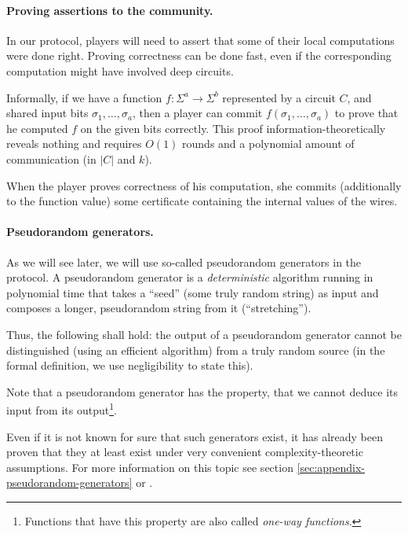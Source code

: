 \paragraph{Proving assertions to the community.}

In our protocol, players will need to assert that some of their local computations were done right. Proving correctness can be done fast, even if the corresponding computation might have involved deep circuits.

Informally, if we have a function $f:\Sigma^a \rightarrow\Sigma^b$ represented by a circuit $C$, and shared input bits $\sigma_1,\dots,\sigma_a$, then a player can commit $f(\sigma_1,\dots,\sigma_a)$ to prove that he computed $f$ on the given bits correctly. This proof information-theoretically reveals nothing and requires $O(1)$ rounds and a polynomial amount of communication (in $|C|$ and $k$).

When the player proves correctness of his computation, she commits (additionally to the function value) some certificate containing the internal values of the wires. 

\paragraph{Pseudorandom generators.}

As we will see later, we will use so-called pseudorandom generators in the protocol. A pseudorandom generator is a \emph{deterministic} algorithm running in polynomial time that takes a ``seed'' (some truly random string) as input and composes a longer, pseudorandom string from it (``stretching''). 

Thus, the following shall hold: the output of a pseudorandom generator cannot be distinguished (using an efficient algorithm) from a truly random source (in the formal definition, we use negligibility to state this).

Note that a pseudorandom generator has the property, that we cannot deduce its input from its output\footnote{Functions that have this property are also called \emph{one-way functions}.}.

Even if it is not known for sure that such generators exist, it has already been proven that they at least exist under very convenient complexity-theoretic assumptions. For more information on this topic see section \ref{sec:appendix-pseudorandom-generators} or \cite{pseudorandom-generators-blum,yao-theory-application-trapdoor-functions}.

